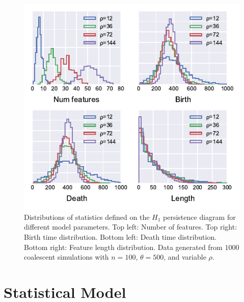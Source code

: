 \begin{figure}
\begin{center}
\centerline{\includegraphics[width=\columnwidth]{./fig/coalescent_sims.pdf}}
\caption[Distributions of statistics defined on the $H_1$ persistence diagram for different model parameters]{Distributions of statistics defined on the $H_1$ persistence diagram for different model parameters. Top left: Number of features. Top right: Birth time distribution. Bottom left: Death time distribution. Bottom right: Feature length distribution. Data generated from $1000$ coalescent simulations with $n=100$, $\theta=500$, and variable $\rho$.}
\label{fig:coalescent_sims}
\end{center}
\end{figure}

\section{Statistical Model}
\label{sec:model}

